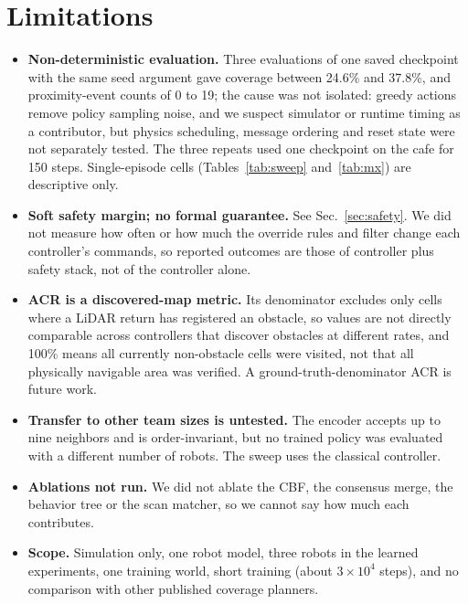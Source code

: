 \documentclass[conference]{IEEEtran}
\begin{document}
\section{Limitations}
\label{sec:limits}
\begin{itemize}
  \item \textbf{Non-deterministic evaluation.} Three evaluations of one saved
        checkpoint with the same seed argument gave coverage between 24.6\%
        and 37.8\%, and proximity-event counts of 0 to 19; the cause was not isolated: greedy actions remove policy sampling noise, and we suspect simulator or runtime timing as a contributor, but physics scheduling, message ordering and reset state were not separately tested. The three repeats used one checkpoint on the cafe for 150 steps. Single-episode cells
        (Tables~\ref{tab:sweep} and~\ref{tab:mx}) are descriptive only.
  \item \textbf{Soft safety margin; no formal guarantee.} See
        Sec.~\ref{sec:safety}. We did not measure how often or how much the
        override rules and filter change each controller's commands, so reported outcomes are those of controller plus safety stack, not of the controller alone.
  \item \textbf{ACR is a discovered-map metric.} Its denominator excludes only cells where a LiDAR return has registered an obstacle, so values are not directly comparable across controllers that discover obstacles at different rates, and 100\% means all currently non-obstacle cells were visited, not that all physically navigable area was verified. A ground-truth-denominator ACR is future work.
  \item \textbf{Transfer to other team sizes is untested.} The encoder accepts
        up to nine neighbors and is order-invariant, but no trained policy was
        evaluated with a different number of robots. The sweep uses the
        classical controller.
  \item \textbf{Ablations not run.} We did not ablate the CBF, the consensus
        merge, the behavior tree or the scan matcher, so we cannot say how
        much each contributes.
  \item \textbf{Scope.} Simulation only, one robot model, three robots in the
        learned experiments, one training world, short training (about
        $3\times10^4$ steps), and no comparison with other published
        coverage planners.
\end{itemize}
\end{document}
